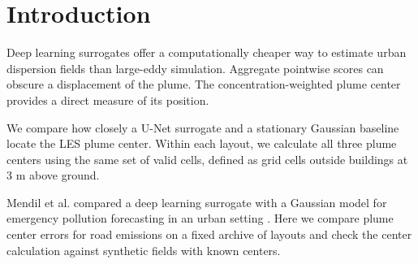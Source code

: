 \documentclass{article}
\begin{document}

\printAffiliationsAndNotice{}
\setlength{\parskip}{4pt}

\begin{abstract}
The concentration-weighted mean of the grid-cell coordinates summarizes where
a plume lies. We compare a simplified stationary Gaussian plume model with
Briggs dispersion widths and a U-Net surrogate trained on large-eddy
simulation (LES) concentration fields. For each of \NScenes{} urban layouts,
we measure the distance from each model's plume center to the LES plume
center at 3\,m above ground. The U-Net error is \MeanDiff\,m smaller on
average, and the U-Net center is closer to the LES center on \NPositive{} of
\NScenes{} layouts.
\end{abstract}

\section{Introduction}
\label{sec:intro}

Deep learning surrogates offer a computationally cheaper way to estimate
urban dispersion fields than large-eddy simulation. Aggregate pointwise
scores can obscure a displacement of the plume. The concentration-weighted
plume center provides a direct measure of its position.

We compare how closely a U-Net surrogate and a stationary Gaussian baseline locate the LES plume center. Within each layout, we calculate all three plume centers using the same set of valid cells, defined as grid cells outside buildings at 3 m above ground.

Mendil et al. compared a deep learning surrogate with a Gaussian model
for emergency pollution forecasting in an urban setting
\citep[\S2.3.2--2.3.3 and \S4.2]{mendil2022}. Here we compare plume center
errors for road emissions on a fixed archive of layouts and check the center calculation against synthetic fields with known centers.
\end{document}
